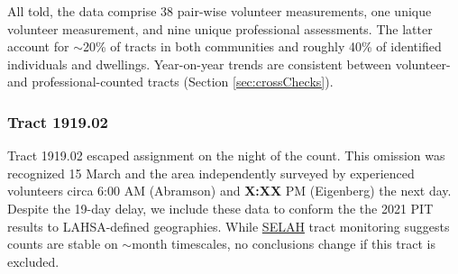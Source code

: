 \documentclass[11pt,twocolumn]{article}
\def\bfr{\bf\color{red}}
\def\Count{count}
\begin{document}
All told, the data comprise 38 pair-wise volunteer measurements, one unique volunteer measurement, 
and nine unique professional assessments. The latter account for $\sim$20\% of tracts in both communities 
and roughly 40\% of identified individuals and dwellings. Year-on-year trends are consistent between
volunteer- and professional-counted tracts (Section \ref{sec:crossChecks}). 

\subsubsection{Tract 1919.02}
\label{sec:191902}

Tract 1919.02 escaped assignment on the night of the \Count. This omission was recognized 15 March
and the area independently surveyed by experienced volunteers circa 6:00 AM (Abramson) and 
{\bfr X:XX} PM (Eigenberg) the next day. Despite the 19-day delay, we include these data to conform the 
the 2021 PIT results to LAHSA-defined geographies. While \href{https://selahnhc.org}
{SELAH} tract monitoring suggests counts are stable on $\sim$month timescales, no conclusions
change if this tract is excluded.%
\end{document}
